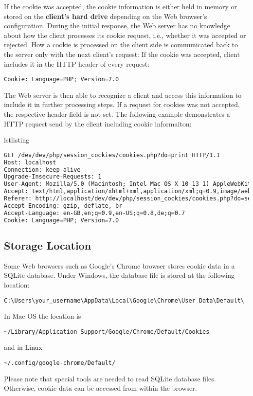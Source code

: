 \documentclass[a4paper, justified, notoc]{tufte-handout} %
\makeatletter
\newenvironment{listing}[1][htbp]
  {\ifvmode\else\unskip\fi\begin{@tufte@float}[#1]{lstlisting}{}}
  {\end{@tufte@float} } %
\makeatother
\begin{document}
If the cookie was accepted, the cookie information is either held in memory or stored on the \textbf{client's hard drive} depending on the Web browser's configuration. %
During the initial response, the Web server has no knowledge about how the client processes its cookie request, i.e., whether it was accepted or rejected.
How a cookie is processed on the client side is communicated back to the server only with the next client's request: If the cookie was accepted, client includes it in the HTTP header of every request:
\begin{Verbatim}
Cookie: Language=PHP; Version=7.0
\end{Verbatim}
The Web server is then able to recognize a client and access this information to include it in further processing steps.
If a request for cookies was not accepted, the respective header field is not set.
The following example demonstrates a HTTP request send by the client including cookie informaiton:
\begin{listing}
\begin{lstlisting}[language=HTML]
GET /dev/dev/php/session_cockies/cookies.php?do=print HTTP/1.1
Host: localhost
Connection: keep-alive
Upgrade-Insecure-Requests: 1
User-Agent: Mozilla/5.0 (Macintosh; Intel Mac OS X 10_13_1) AppleWebKit/537.36 (KHTML, like Gecko) Chrome/63.0.3239.84 Safari/537.36
Accept: text/html,application/xhtml+xml,application/xml;q=0.9,image/webp,image/apng,*/*;q=0.8
Referer: http://localhost/dev/dev/php/session_cockies/cookies.php?do=set
Accept-Encoding: gzip, deflate, br
Accept-Language: en-GB,en;q=0.9,en-US;q=0.8,de;q=0.7
Cookie: Language=PHP; Version=7.0
\end{lstlisting}
	\caption{A client's HTTP request with cookie data included}
	\label{setting_cookies}
\end{listing}


\subsection{Storage Location} %
\label{sub:storage_location}
Some Web browsers such as Google's Chrome browser stores cookie data in a SQLite database. 
Under Windows, the database file is stored at the following location:
\begin{Verbatim}
C:\Users\your_username\AppData\Local\Google\Chrome\User Data\Default\
\end{Verbatim}
In Mac OS the location is
\begin{Verbatim}
~/Library/Application Support/Google/Chrome/Default/Cookies
\end{Verbatim}
and in Linux
\begin{Verbatim}
~/.config/google-chrome/Default/
\end{Verbatim}
Please note that special tools are needed to read SQLite database files. Otherwise, cookie data can be accessed from within the browser.
\end{document}
